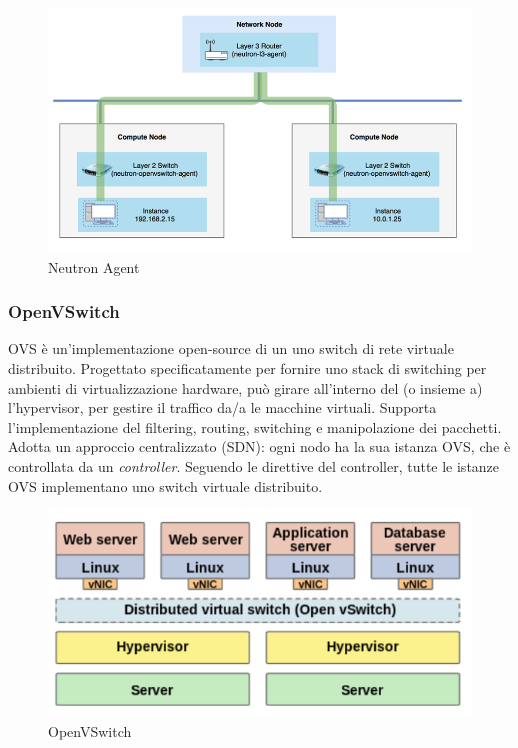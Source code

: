 \documentclass{article}
\begin{document}
\begin{figure}[H]
    \centering
    \includegraphics[scale=0.5]{img/neutron agent.png}
    \caption{Neutron Agent}
\end{figure}\noindent

\subsubsection{OpenVSwitch}
OVS è un'implementazione open-source di un uno switch di rete virtuale distribuito. Progettato specificatamente per fornire uno stack di switching per ambienti di virtualizzazione hardware, può girare all'interno del (o insieme a) l'hypervisor, per gestire il traffico da/a le macchine virtuali. Supporta l'implementazione del filtering, routing, switching e manipolazione dei pacchetti. \\
Adotta un approccio centralizzato (SDN): ogni nodo ha la sua istanza OVS, che è controllata da un \textit{controller}. Seguendo le direttive del controller, tutte le istanze OVS implementano uno switch virtuale distribuito.
\begin{figure}[H]
    \centering
    \includegraphics[scale=0.5]{img/openvswitch.png}
    \caption{OpenVSwitch}
\end{figure}\noindent
\end{document}
